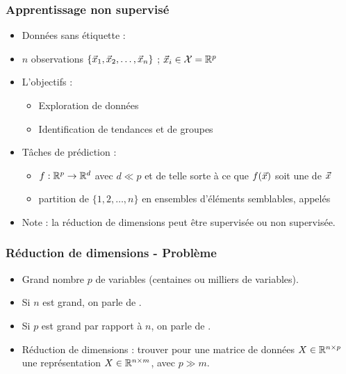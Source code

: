 
\begin{frame}
  \frametitle{Apprentissage non supervisé}
  \begin{itemize}
    \item Données sans étiquette : 
    \item[] $n$ observations $\{\vec{x}_1, \vec{x}_2, \dots, \vec{x}_n\}$ ; $\vec{x}_i \in \mathcal{X} = {\mathbb R}^p$
    \item L'objectifs : 
    \begin{itemize}
      \item Exploration de données
      \item Identification de tendances et de groupes
    \end{itemize} 
    \item Tâches de prédiction : 
    \begin{itemize}
        \item {} $f : {\mathbb R}^p \rightarrow {\mathbb R}^d$ avec
          $d \ll p$ et de telle sorte à ce que $f(\vec{x})$ soit une
           de $\vec{x}$
        \item {} partition de $\{1, 2, \dots, n\}$ en ensembles
        d'éléments semblables, appelés 
    \end{itemize}
    \item Note : la réduction de dimensions peut être supervisée ou non supervisée. 
    \end{itemize}
\end{frame}

\begin{frame}
  \begin{center}
  \end{center}
\end{frame}

\begin{frame}
  \frametitle{Réduction de dimensions - Problème}
  \begin{itemize}
  \item Grand nombre $p$ de variables (centaines ou milliers de variables).
  \item Si $n$ est grand, on parle de .   
  \item Si $p$ est grand par rapport à $n$, on parle de . 
  \item Réduction de dimensions : trouver pour une matrice de données $X\in {\mathbb R}^{n\times p}$ une représentation $X \in {\mathbb R}^{n\times m}$, avec $p\gg m$. 
  \end{itemize}
\end{frame}

